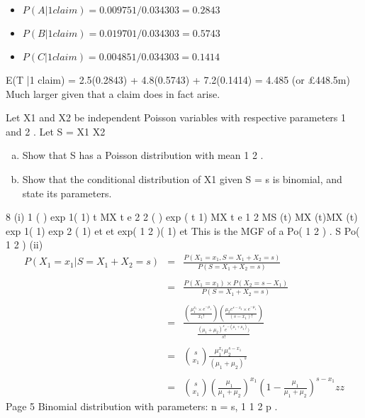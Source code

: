 \documentclass[a4paper,12pt]{article}
\begin{document}
\begin{itemize}
    \item $P(A|1 claim) = 0.009751/0.034303 = 0.2843$
\item $P(B|1 claim) = 0.019701/0.034303 = 0.5743$
\item $P(C|1 claim) = 0.004851/0.034303 = 0.1414$
\end{itemize}
E(T |1 claim) = 2.5(0.2843) + 4.8(0.5743) + 7.2(0.1414) = 4.485
(or £448.5m)
Much larger given that a claim does in fact arise.
\newpage

Let X1 and X2 be independent Poisson variables with respective parameters 1
and 2 .
Let S = X1 X2
\begin{enumerate}[(a)]
\item  Show that S has a Poisson distribution with mean 1 2 . 
\item  Show that the conditional distribution of X1 given S = s is binomial, and state its parameters.
\end{enumerate}


8 (i)
1 ( ) exp{ 1( 1)} t
MX t e
2 2 ( ) exp{ ( t 1)}
MX t e
1 2
MS (t) MX (t)MX (t)
exp{ 1( 1)} exp{ 2 ( 1)} et et
exp{( 1 2 )( 1)} et
This is the MGF of a Po( 1 2 ) .
S Po( 1 2 )
(ii) 
{
\large
\begin{eqnarray*}
P(X_1 =x_1|S = X_1+X_2 = s) &=&
\frac{P(X_1 =x_1,S = X_1+X_2 = s)}{P(S = X_1+X_2 = s)} \\
& & \\
&=& \frac{P(X_1 =x_1) \times P(X_2 = s-X_1)}{P(S = X_1+X_2 = s)} \\
& & \\
&=& \frac{  \left(\frac{\mu_1^{x_1} \times e^{-\mu_1}}{x_1!}\right)\left(\frac{\mu_2e^{s-x_2} \times e^{-\mu_1} }{(s-x_1)!}\right)  }{ \frac{ (\mu_1+\mu_2)^s e^{-(\mu_1 + \mu_2)})}{s!}}  \\
& & \\
&=&  {s \choose x_1}\frac{\mu_1^{x_1} \mu_2^{s-x_1}}{(\mu_1 + \mu_2)^s} \\
& & \\
&=&  {s \choose x_1} \left( \frac{\mu_1}{\mu_1 + \mu_2} \right)^{x_1} \left( 1- \frac{\mu_1}{\mu_1 + \mu_2} \right)^{s-x_1}zz
\end{eqnarray*}
}
Page 5
Binomial distribution with parameters: n = s, 1
1 2
p .
\end{document}
